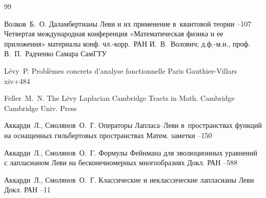 \begin{thebibliography}{99}

\by  Волков~Б.~О.
\paper Даламбертианы Леви и их применение в~квантовой теории 
--107
\inbook Четвертая международная конференция «Математическая физика и ее приложения»
\bookinfo материалы конф. 
\eds чл.-корр.~РАН И.~В.~Волович; д.ф.-м.н., проф. В.~П.~Радченко
\publaddr Самара
\publ СамГТУ



\by L\'evy~P. 
\book Probl\`emes concrets d'analyse fonctionnelle
\publaddr  Paris
\publ Gauthier-Villars
\totalpages xiv+484


\by  Feller~M.~N. 
\book The L\'evy Laplacian
\serial Cambridge Tracts in Math.
\publaddr  Cambridge  
\publ Cambridge Univ. Press 



\by Аккарди~Л., Смолянов~О.~Г.
\paper Операторы Лапласа--Леви в~пространствах функций на оснащенных гильбертовых пространствах
\jour Матем. заметки
--150



\by Аккарди~Л., Смолянов~О.~Г.
\paper Формулы Фейнмана для эволюционных уравнений с лапласианом Леви на бесконечномерных многообразиях
\jour Докл. РАН
--588



\by Аккарди~Л., Смолянов~О.~Г.
\paper Классические и неклассические лапласианы Леви
\jour Докл. РАН
--11




\end{thebibliography}
